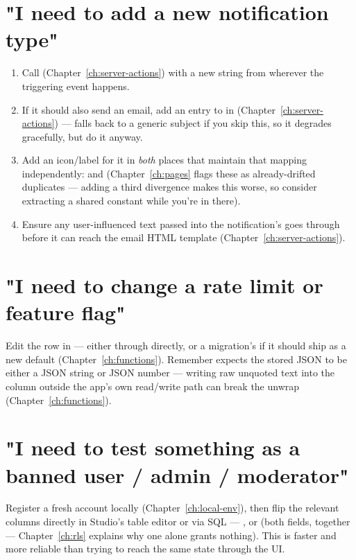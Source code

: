 \section{"I need to add a new notification type"}
\begin{enumerate}
  \item Call  (Chapter~\ref{ch:server-actions}) with a new  string from wherever the triggering event happens.
  \item If it should also send an email, add an entry to  in  (Chapter~\ref{ch:server-actions}) — falls back to a generic subject if you skip this, so it degrades gracefully, but do it anyway.
  \item Add an icon/label for it in \emph{both} places that maintain that mapping independently:  and  (Chapter~\ref{ch:pages} flags these as already-drifted duplicates — adding a third divergence makes this worse, so consider extracting a shared constant while you're in there).
  \item Ensure any user-influenced text passed into the notification's  goes through  before it can reach the email HTML template (Chapter~\ref{ch:server-actions}).
\end{enumerate}

\section{"I need to change a rate limit or feature flag"}
Edit the row in  — either through  directly, or a migration's  if it should ship as a new default (Chapter~\ref{ch:functions}). Remember  expects the stored JSON to be either a JSON string or JSON number — writing raw unquoted text into the  column outside the app's own read/write path can break the  unwrap (Chapter~\ref{ch:functions}).

\section{"I need to test something as a banned user / admin / moderator"}
Register a fresh account locally (Chapter~\ref{ch:local-env}), then flip the relevant  columns directly in Studio's table editor or via SQL — , or  (both fields, together — Chapter~\ref{ch:rls} explains why one alone grants nothing). This is faster and more reliable than trying to reach the same state through the UI.

